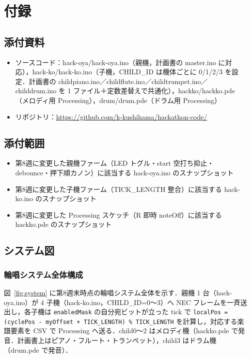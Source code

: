 \documentclass[a4paper,11pt]{ltjsarticle}
\providecommand{\％}{\%}
\begin{document}
\section{付録}\label{sec:appendix}

\subsection{添付資料}\label{sec:attach}

\begin{itemize}
    \item ソースコード：hack-oya/hack-oya.ino（親機，計画書の master.ino に対応），hack-ko/hack-ko.ino（子機，CHILD\_ID は機体ごとに 0/1/2/3 を設定．計画書の childpiano.ino／childflute.ino／childtrumpet.ino／childdrum.ino を 1 ファイル＋定数差替えで共通化），hackko/hackko.pde（メロディ用 Processing），drum/drum.pde（ドラム用 Processing）
    \item リポジトリ：\url{https://github.com/k-kushihama/hackathon-code/}
\end{itemize}

\subsection{添付範囲}\label{sec:attach-scope}

\begin{itemize}
    \item 第8週に変更した親機ファーム（LED トグル・start 空打ち抑止・debounce・押下順カノン）に該当する hack-oya.ino のスナップショット
    \item 第8週に変更した子機ファーム（TICK\_LENGTH 整合）に該当する hack-ko.ino のスナップショット
    \item 第8週に変更した Processing スケッチ（R 即時 noteOff）に該当する hackko.pde のスナップショット
\end{itemize}

\subsection{システム図}\label{sec:diagrams}

\subsubsection{輪唱システム全体構成}\label{sec:sysdiag}

図~\ref{fig:system} に第8週末時点の輪唱システム全体を示す．親機 1 台（hack-oya.ino）が 4 子機（hack-ko.ino，CHILD\_ID=0〜3）へ NEC フレームを一斉送出し，各子機は \texttt{enabledMask} の自分宛ビットが立った tick で \texttt{localPos = (cyclePos - myOffset + TICK\_LENGTH) \% TICK\_LENGTH} を計算し，対応する楽譜要素を CSV で Processing へ送る．child0〜2 はメロディ機（hackko.pde で発音．計画書上はピアノ・フルート・トランペット），child3 はドラム機（drum.pde で発音）．
\end{document}
